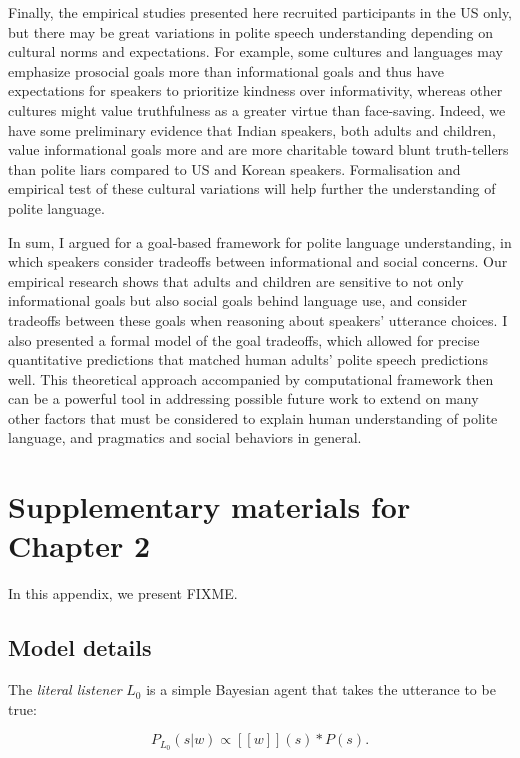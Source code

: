 \documentclass[oneside]{report}
\begin{document}
Finally, the empirical studies presented here recruited participants in
the US only, but there may be great variations in polite speech
understanding depending on cultural norms and expectations. For example,
some cultures and languages may emphasize prosocial goals more than
informational goals and thus have expectations for speakers to
prioritize kindness over informativity, whereas other cultures might
value truthfulness as a greater virtue than face-saving. Indeed, we have
some preliminary evidence that Indian speakers, both adults and
children, value informational goals more and are more charitable toward
blunt truth-tellers than polite liars compared to US and Korean
speakers. Formalisation and empirical test of these cultural variations
will help further the understanding of polite language.

In sum, I argued for a goal-based framework for polite language
understanding, in which speakers consider tradeoffs between
informational and social concerns. Our empirical research shows that
adults and children are sensitive to not only informational goals but
also social goals behind language use, and consider tradeoffs between
these goals when reasoning about speakers' utterance choices. I also
presented a formal model of the goal tradeoffs, which allowed for
precise quantitative predictions that matched human adults' polite
speech predictions well. This theoretical approach accompanied by
computational framework then can be a powerful tool in addressing
possible future work to extend on many other factors that must be
considered to explain human understanding of polite language, and
pragmatics and social behaviors in general.

\appendix

\chapter{Supplementary materials for Chapter
2}\label{supplementary-materials-for-chapter-2}

In this appendix, we present FIXME.

\section{Model details}\label{model-details}

The \emph{literal listener} \(L_0\) is a simple Bayesian agent that
takes the utterance to be true:

\[P_{L_0}(s | w) \propto [\![ w ]\!] (s) * P(s).\]
\end{document}

